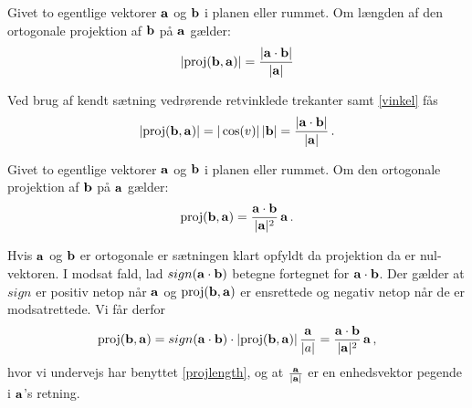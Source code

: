 \begin{theorem}\label{projlength}
Givet to egentlige vektorer $\mathbf{a}$ og $\mathbf{b}$ i planen eller rummet. Om længden af den ortogonale projektion af $\mathbf{b}$ på $\mathbf{a}$ gælder: 
\begin{equation}
|\mathrm{proj}(\mathbf{b},\mathbf{a})|=\frac{|\mathbf{a} \cdot \mathbf{b}|}{|\mathbf{a}|}
\end{equation}
\end{theorem}
\begin{bevis}
Ved brug af kendt sætning vedrørende retvinklede trekanter samt \ref{vinkel} fås
$$
|\mathrm{proj}(\mathbf{b},\mathbf{a})|=|\cos(v)|\,|\mathbf{b}|=\frac{|\mathbf{a} \cdot \mathbf{b}|}{|\mathbf{a}|}\,.
$$
\end{bevis}

\begin{theorem}
Givet to egentlige vektorer $\mathbf{a}$ og $\mathbf{b}$ i planen eller rummet. Om den ortogonale projektion af $\mathbf{b}$ på $\mathbf{a}$ gælder: 
\begin{equation}
\mathrm{proj}(\mathbf{b},\mathbf{a})=\frac{\mathbf{a} \cdot \mathbf{b}}{|\mathbf{a}|^2}\,\mathbf{a}\,.
\end{equation}
\end{theorem}

\begin{bevis}
Hvis $\mathbf{a}$ og $\mathbf{b}$ er ortogonale er sætningen klart opfyldt da projektion da er nul-vektoren. I modsat fald, lad $sign(\mathbf{a} \cdot \mathbf{b})$ betegne fortegnet for $\mathbf{a} \cdot \mathbf{b}$. Der gælder at $sign$ er positiv netop når $\mathbf{a}$ og $\mathrm{proj}(\mathbf{b},\mathbf{a})$ er ensrettede og negativ netop når de er modsatrettede. Vi får derfor 
$$
\mathrm{proj}(\mathbf{b},\mathbf{a})=sign(\mathbf{a} \cdot \mathbf{b})\cdot|\mathrm{proj}(\mathbf{b},\mathbf{a})|\,\frac{\mathbf{a}}{|a|}=\frac{\mathbf{a} \cdot \mathbf{b}}{|\mathbf{a}|^2}\,\mathbf{a}\,,
$$
hvor vi undervejs har benyttet \ref{projlength}, og at $\frac{\mathbf{a}}{|\mathbf{a}|}$ er en enhedsvektor pegende i $\mathbf{a}$'s retning.
\end{bevis}

